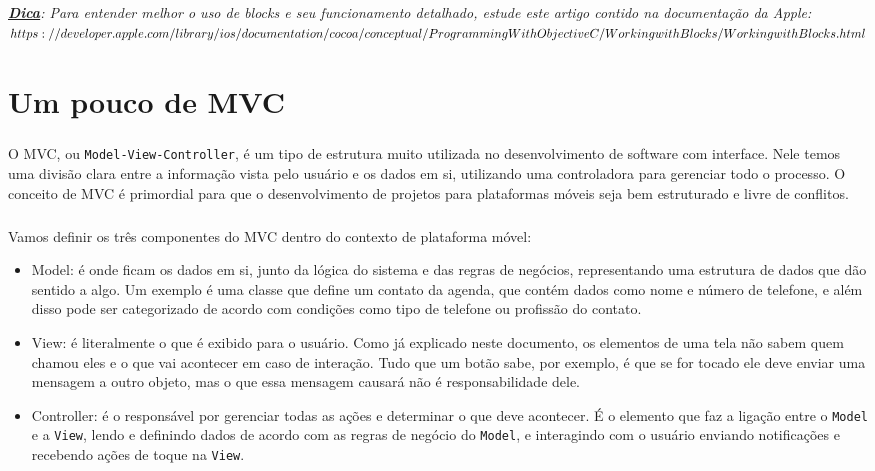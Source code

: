 \documentclass[a4paper,12pt,brazil,doubleside]{book}
\begin{document}
\bigskip

\paragraph{}\textit{\textbf{\underline{Dica}}: Para entender melhor o uso de blocks e seu funcionamento detalhado, estude este artigo contido na documentação da Apple:\\
\(https://developer.apple.com/library/ios/documentation/cocoa/conceptual/\\ProgrammingWithObjectiveC/WorkingwithBlocks/WorkingwithBlocks.html\)}



\chapter{Um pouco de MVC}

\paragraph{}O MVC, ou \texttt{Model-View-Controller}, é um tipo de estrutura muito utilizada no desenvolvimento de software com interface. Nele temos uma divisão clara entre a informação vista pelo usuário e os dados em si, utilizando uma controladora para gerenciar todo o processo. O conceito de MVC é primordial para que o desenvolvimento de projetos para plataformas móveis seja bem estruturado e livre de conflitos.
\paragraph{}Vamos definir os três componentes do MVC dentro do contexto de plataforma móvel:
\begin{itemize}
\item Model: é onde ficam os dados em si, junto da lógica do sistema e das regras de negócios, representando uma estrutura de dados que dão sentido a algo. Um exemplo é uma classe que define um contato da agenda, que contém dados como nome e número de telefone, e além disso pode ser categorizado de acordo com condições como tipo de telefone ou profissão do contato.
\item View: é literalmente o que é exibido para o usuário. Como já explicado neste documento, os elementos de uma tela não sabem quem chamou eles e o que vai acontecer em caso de interação. Tudo que um botão sabe, por exemplo, é que se for tocado ele deve enviar uma mensagem a outro objeto, mas o que essa mensagem causará não é responsabilidade dele.
\item Controller: é o responsável por gerenciar todas as ações e determinar o que deve acontecer. É o elemento que faz a ligação entre o \texttt{Model} e a \texttt{View}, lendo e definindo dados de acordo com as regras de negócio do \texttt{Model}, e interagindo com o usuário enviando notificações e recebendo ações de toque na \texttt{View}.
\end{itemize}
\end{document}
